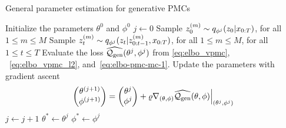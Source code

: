 \begin{algorithm}[htbp!]
    \caption{General parameter estimation for generative PMCs}
    \label{algo:algo_train_dpmc_gen}
  \begin{algorithmic}[1]
    \State Initialize the parameters $\theta^0$ and $\phi^0$
    \State $j\leftarrow 0$\label{line:start_vpmc}
      \State Sample $z_0^{(m)}\sim q_{\phi^{{j}}}(z_0|x_{0:T})$,  for all  $1 \leq m \leq M$ 
      \State Sample $z_t^{(m)}\sim q_{\phi^{{j}}}(z_t|z_{0:t-1}^{(m)},x_{0:T})$,   for all  $1 \leq m \leq M$, for all $1 \leq t \leq T$ 
      \State Evaluate the loss $\widehat{\mathcal{Q}_{\mathrm{gen}}}(\theta^{{j}},\phi^{{j}})$ 
      from \eqref{eq:elbo_vpmc},
      ~\eqref{eq:elbo_vpmc_l2},
      and~\eqref{eq:elbo-pmc-mc-1}. 
      \label{line:evaluate_loss}
      \label{line:derivate_pmc} 
      \State Update the parameters with gradient ascent
    \begin{equation}
    \begin{pmatrix}\theta^{(j+1)}\\\phi^{(j+1)}\end{pmatrix}=
    \begin{pmatrix}\theta^{{j}}\\\phi^{{j}}\end{pmatrix}
    + \varrho {\nabla_{(\theta, \phi)} \widehat{\mathcal{Q}_{\mathrm{gen}}}(\theta,\phi)}\Big|_{(\theta^{{j}},\phi^{{j}})}
    \label{eq:elbo_grad_vpmc}
    \end{equation}
    \State  $j\leftarrow j+1$
    \EndWhile
    \State  $\theta^{*} \leftarrow \theta^{{j}}$
    \State  $\phi^{*} \leftarrow \phi^{{j}}$
    \label{line:end_dtmc_vpmc}
  \end{algorithmic}
  \end{algorithm}




